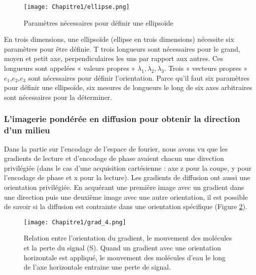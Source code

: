 \begin{figure}[!htbp]
  \begin{center}
    \texttt{[image: Chapitre1/ellipse.png]}
     \end{center}
    \caption{Paramètres nécessaires pour définir une ellipsoïde}
  \label{fig:ellipse}
\end{figure}

En trois dimensions, une ellipsoïde (ellipse en trois dimensions) nécessite six paramètres pour être définie. T trois longueurs sont nécessaires pour le grand, moyen et petit axe, perpendiculaires les uns par rapport aux autres. Ces longueurs sont appelées « valeurs propres » $\lambda_1,\lambda_2,\lambda_3$. Trois « vecteurs propres » $e_1$,$e_2$,$e_3$ sont nécessaires pour définir l’orientation. Parce qu’il faut six paramètres pour définir une ellipsoïde, six mesures de longueurs le long de six axes arbitraires sont nécessaires pour la déterminer.

\subsubsection{L’imagerie pondérée en diffusion pour obtenir la direction d’un milieu}

Dans la partie sur l’encodage de l’espace de fourier, nous avons vu que les gradients de lecture et d’encodage de phase avaient chacun une direction privilégiée (dans le cas d’une acquisition cartésienne : axe z pour la coupe, y pour l’encodage de phase et x pour la lecture). Les gradients de diffusion ont aussi une orientation privilégiée. En acquérant une première image avec un gradient dans une direction puis une deuxième image avec une autre orientation, il est possible de savoir si la diffusion est contrainte dans une orientation spécifique (Figure \ref{fig:grad_4}).

\begin{figure}[!htbp]
  \begin{center}
    \texttt{[image: Chapitre1/grad\_4.png]}
     \end{center}
    \caption{Relation entre l’orientation du gradient, le mouvement des molécules et la perte du signal (S). Quand un gradient avec une orientation horizontale est appliqué, le mouvement des molécules d’eau le long de l’axe horizontale entraine une perte de signal. }
  \label{fig:grad_4}
\end{figure}

